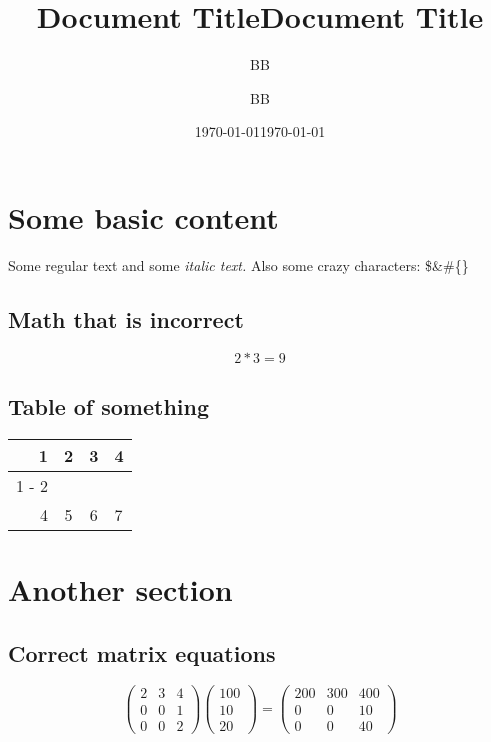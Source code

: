 \documentclass{article}%
\title{Document Title}%
\author{BB}%
\date{\today}%
\title{Document Title}%
\author{BB}%
\date{\today}%
\begin{document}
%
\normalsize%
\section{Some basic content}%
\label{sec:Somebasiccontent}%
Some regular text and some%
\textit{italic text. }%
\newline%
Also some crazy characters: \$\&\#\{\}

%
\subsection{Math that is incorrect}%
\label{subsec:Maththatisincorrect}%
\[%
2*3 = 9%
\]

%
\subsection{Table of something}%
\label{subsec:Tableofsomething}%
\begin{tabular}{rc|cl}%
\hline%
1&2&3&4\\%
\cline{1%
-%
2}%
&&&\\%
4&5&6&7\\%
\end{tabular}

%
\section{Another section}%
\label{sec:Anothersection}%

%
\subsection{Correct matrix equations}%
\label{subsec:Correctmatrixequations}%
\[%
\begin{pmatrix}%
2&3&4\\%
0&0&1\\%
0&0&2%
\end{pmatrix} \begin{pmatrix}%
100\\%
10\\%
20%
\end{pmatrix} = \begin{pmatrix}%
200&300&400\\%
0&0&10\\%
0&0&40%
\end{pmatrix}%
\]

%
\end{document}
